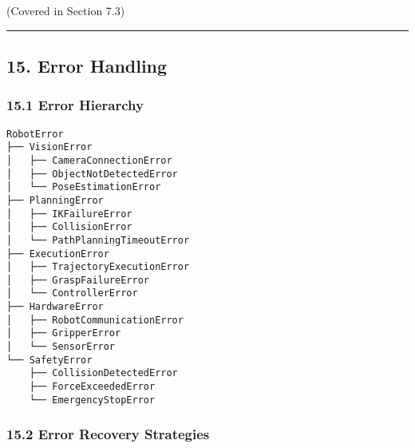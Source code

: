 \documentclass[
]{article}
\begin{document}
(Covered in Section 7.3)

\begin{center}\rule{0.5\linewidth}{0.5pt}\end{center}

\hypertarget{error-handling}{%
\subsection{15. Error Handling}\label{error-handling}}

\hypertarget{error-hierarchy}{%
\subsubsection{15.1 Error Hierarchy}\label{error-hierarchy}}

\begin{verbatim}
RobotError
├── VisionError
│   ├── CameraConnectionError
│   ├── ObjectNotDetectedError
│   └── PoseEstimationError
├── PlanningError
│   ├── IKFailureError
│   ├── CollisionError
│   └── PathPlanningTimeoutError
├── ExecutionError
│   ├── TrajectoryExecutionError
│   ├── GraspFailureError
│   └── ControllerError
├── HardwareError
│   ├── RobotCommunicationError
│   ├── GripperError
│   └── SensorError
└── SafetyError
    ├── CollisionDetectedError
    ├── ForceExceededError
    └── EmergencyStopError
\end{verbatim}

\hypertarget{error-recovery-strategies}{%
\subsubsection{15.2 Error Recovery
Strategies}\label{error-recovery-strategies}}
\end{document}
